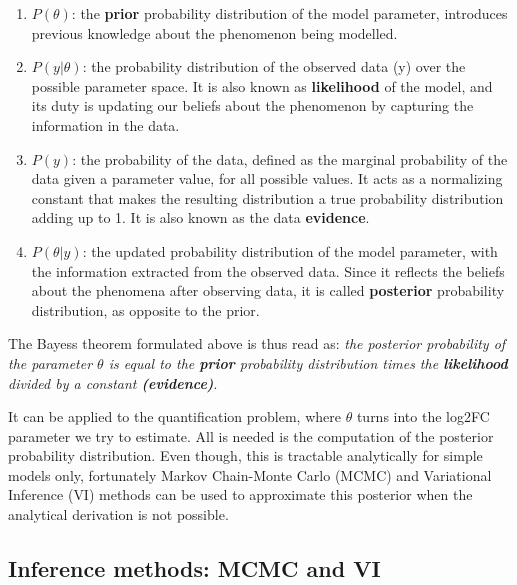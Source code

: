 \begin{enumerate}

\item $P(\theta)$: the \textbf{prior} probability distribution of the model parameter, introduces previous knowledge about the phenomenon being modelled.

\item $P(y | \theta)$: the probability distribution of the observed data (y) over the possible parameter space. It is also known as \textbf{likelihood} of the model, and its duty is updating our beliefs about the phenomenon by capturing the information in the data.

\item $P(y)$: the probability of the data, defined as the marginal probability of the data given a parameter value, for all possible values. It acts as a normalizing constant that makes the resulting distribution a true probability distribution adding up to 1. It is also known as the data \textbf{evidence}.

\item $P(\theta | y)$: the updated probability distribution of the model parameter, with the information extracted from the observed data. Since it reflects the beliefs about the phenomena after observing data, it is called \textbf{posterior} probability distribution, as opposite to the prior.

\end{enumerate}


The Bayes\textquotesingle s theorem formulated above is thus read as: \textit{the posterior probability of the parameter $\theta$ is equal to the \textbf{prior} probability distribution times the \textbf{likelihood} divided by a constant \textbf{(evidence)}}.

It can be applied to the quantification problem, where $\theta$ turns into the \ac{log2FC} parameter we try to estimate. All is needed is the computation of the posterior probability distribution. Even though, this is tractable analytically for simple models only, fortunately Markov Chain-Monte Carlo (\ac{MCMC}) and Variational Inference (\ac{VI}) methods can be used to approximate this posterior when the analytical derivation is not possible.

\subsection{Inference methods: \ac{MCMC} and \ac{VI}}


